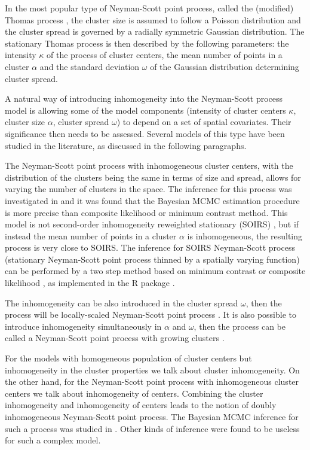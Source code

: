 In the most popular type of Neyman-Scott point process, called the (modified) Thomas process \citep{Thomas1949}, the cluster size is assumed to follow a Poisson distribution and the cluster spread is governed by a radially symmetric Gaussian distribution. The stationary Thomas process is then described by the following parameters: the intensity $\kappa$ of the process of cluster centers, the mean number of points in a cluster $\alpha$ and the standard deviation $\omega$ of the Gaussian distribution determining cluster spread.

A natural way of introducing inhomogeneity into the Neyman-Scott process model is allowing some of the model components (intensity of cluster centers $\kappa$, cluster size $\alpha$, cluster spread $\omega$) to depend on a set of spatial covariates. Their significance then needs to be assessed. Several models of this type have been studied in the literature, as discussed in the following paragraphs.

The Neyman-Scott point process with inhomogeneous cluster centers, with the distribution of the clusters being the same in terms of size and spread, allows for varying the number of clusters in the space. The inference for this process was investigated in \citet{MMK2014} and it was found that the Bayesian MCMC estimation procedure is more precise than composite likelihood or minimum contrast method. This model is not second-order inhomogeneity reweighted stationary (SOIRS) \citep{BMW2000}, but if instead the mean number of points in a cluster $\alpha$ is inhomogeneous, the resulting process is very close to SOIRS. The inference for SOIRS Neyman-Scott process (stationary Neyman-Scott point process thinned by a spatially varying function) can be performed by a two step method based on minimum contrast or composite likelihood \citep{WG2009}, as implemented in the R package  \citep{spatstat}. 

The inhomogeneity can be also introduced in the cluster spread $\omega$, then the process will be locally-scaled Neyman-Scott point process \citep{HJLN2003}. It is also possible to introduce inhomogeneity simultaneously in  $\alpha$ and $\omega$, then the process can be called a  Neyman-Scott point process with growing clusters \citep{M2014}.

For the models with homogeneous population of cluster centers but inhomogeneity in the cluster properties we talk about cluster inhomogeneity. On the other hand, for the Neyman-Scott point process with inhomogeneous cluster centers we talk about inhomogeneity of centers. Combining the cluster inhomogeneity and inhomogeneity of centers leads to the notion of doubly inhomogeneous Neyman-Scott point process. The Bayesian MCMC inference for such a process was studied in \cite{MS2017}. Other kinds of inference were found to be useless for such a complex model.


